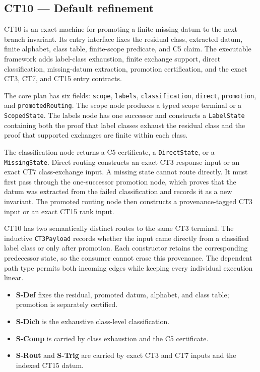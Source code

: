 \subsection{CT10 --- Default refinement}\label{ct:10}\label{the-default-refinement}

CT10 is an exact machine for promoting a finite missing datum to the next
branch invariant.  Its entry interface fixes the residual class, extracted
datum, finite alphabet, class table, finite-scope predicate, and C5 claim.  The
executable framework adds label-class exhaustion, finite exchange support,
direct classification, missing-datum extraction, promotion certification, and
the exact CT3, CT7, and CT15 entry contracts.

The core plan has six fields: \texttt{scope}, \texttt{labels},
\texttt{classification}, \texttt{direct}, \texttt{promotion}, and
\texttt{promotedRouting}.  The scope node produces a typed scope terminal or
a \texttt{ScopedState}.  The labels node has one successor and constructs a
\texttt{LabelState} containing both the proof that label classes exhaust the
residual class and the proof that supported exchanges are finite within each
class.

The classification node returns a C5 certificate, a
\texttt{DirectState}, or a \texttt{MissingState}.  Direct routing constructs
an exact CT3 response input or an exact CT7 class-exchange input.  A missing
state cannot route directly.  It must first pass through the one-successor
promotion node, which proves that the datum was extracted from the failed
classification and records it as a new invariant.  The promoted routing node
then constructs a provenance-tagged CT3 input or an exact CT15 rank input.

CT10 has two semantically distinct routes to the same CT3 terminal.  The
inductive \texttt{CT3Payload} records whether the input came directly from a
classified label class or only after promotion.  Each constructor retains the
corresponding predecessor state, so the consumer cannot erase this provenance.
The dependent path type permits both incoming edges while keeping every
individual execution linear.

\begin{itemize}
\tightlist
\item \textbf{S-Def} fixes the residual, promoted datum, alphabet, and class table; promotion is separately certified.
\item \textbf{S-Dich} is the exhaustive class-level classification.
\item \textbf{S-Comp} is carried by class exhaustion and the C5 certificate.
\item \textbf{S-Rout} and \textbf{S-Trig} are carried by exact CT3 and CT7 inputs and the indexed CT15 datum.
\end{itemize}

